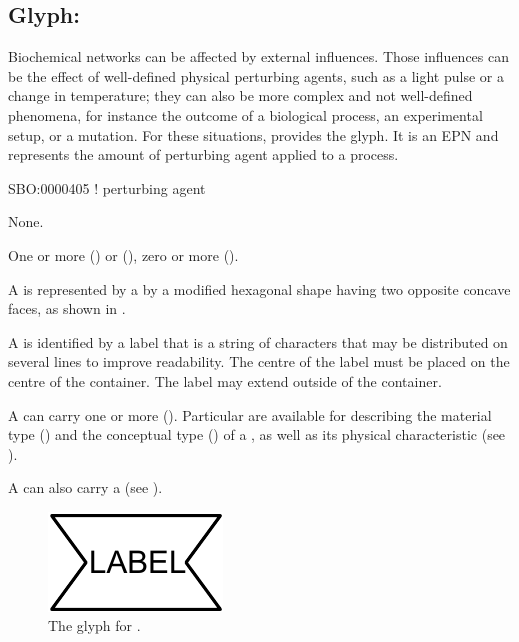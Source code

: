 \subsection{Glyph: }
\label{sec:perturbing agent}

Biochemical networks can be affected by external influences.
Those influences can be the effect of well-defined physical perturbing agents, such as a light pulse or a change in temperature; they can also be more complex and not well-defined phenomena, for instance the outcome of a biological process, an experimental setup, or a mutation.
For these situations, \PD provides the  glyph. It is an EPN and represents the amount of perturbing agent applied to a process.

\begin{glyphDescription}

\glyphSboTerm
SBO:0000405 ! perturbing agent


\glyphIncoming
None.

\glyphOutgoing
One or more  () or  (), zero or more  ().

\glyphContainer
A  is represented by a by a modified hexagonal shape having two opposite concave faces, as shown in .

\glyphLabel
A  is identified by a label that is  a string of characters that may be distributed on several lines to improve readability.
The centre of the label must be placed on the centre of the container.
The label may extend outside of the container.

\glyphAux
A  can carry one or more  ().
Particular  are available for describing the material type () and the conceptual type () of a , as well as its physical characteristic (see ).

A  can also carry a  (see ).

\end{glyphDescription}

\begin{figure}[H]
  \centering
  \includegraphics{images/build/perturbing_agent.pdf}
  \caption{The \PD glyph for .}
  \label{fig:perturbing_agent}
\end{figure}
